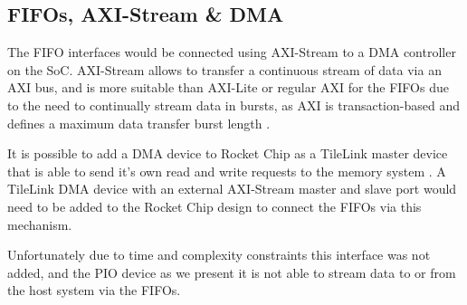 \subsection{FIFOs, AXI-Stream \& DMA}
\label{sec:dma}

The FIFO interfaces would be connected using AXI-Stream to a DMA controller on the SoC. AXI-Stream allows to transfer a continuous stream of data via an AXI bus, and is more suitable than AXI-Lite or regular AXI for the FIFOs due to the need to continually stream data in bursts, as AXI is transaction-based and defines a maximum data transfer burst length \cite{axi_stream}.

It is possible to add a DMA device to Rocket Chip as a TileLink master device that is able to send it's own read and write requests to the memory system \cite{chipyard}. A TileLink DMA device with an external AXI-Stream master and slave port would need to be added to the Rocket Chip design to connect the FIFOs via this mechanism.

Unfortunately due to time and complexity constraints this interface was not added, and the PIO device as we present it is not able to stream data to or from the host system via the FIFOs.
